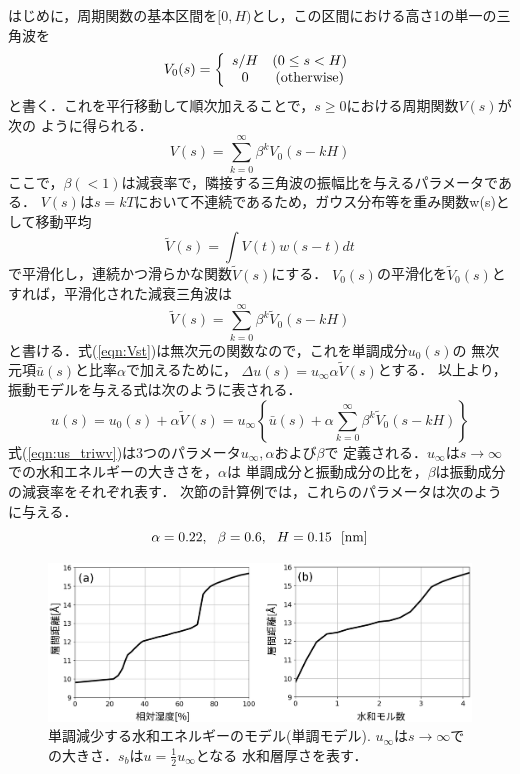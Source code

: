 はじめに，周期関数の基本区間を$[0,H)$とし，この区間における高さ1の単一の三角波を
\begin{equation}
	V_0(s)=\left\{
		\begin{array}{cc}
			s/H & (0\leq s < H) \\
			0 & ({\rm otherwise})
		\end{array}
	\right.
	\label{eqn:V0}
\end{equation}
と書く．これを平行移動して順次加えることで，$s\geq 0$における周期関数$V(s)$が次の
ように得られる．
\begin{equation}
	V(s)=\sum_{k=0}^{\infty} \beta ^{k} V_0(s-kH)
	\label{eqn:Vs}
\end{equation}
ここで，$\beta(<1)$は減衰率で，隣接する三角波の振幅比を与えるパラメータである．
$V(s)$は$s=kT$において不連続であるため，ガウス分布等を重み関数w(s)として移動平均
\begin{equation}
	\tilde V(s)=\int V(t)w(s-t)dt
	\label{eqn:mv_ave}
\end{equation}
で平滑化し，連続かつ滑らかな関数$\tilde V(s)$にする．
$V_0(s)$の平滑化を$\tilde V_0(s)$とすれば，平滑化された減衰三角波は
\begin{equation}
	\tilde V(s)=\sum_{k=0}^{\infty} \beta ^{k} \tilde V_0(s-kH)
	\label{eqn:Vst}
\end{equation}
と書ける．式(\ref{eqn:Vst})は無次元の関数なので，これを単調成分$u_0(s)$の
無次元項$\bar{u}(s)$と比率$\alpha$で加えるために，
$\Delta u(s)=u_\infty\alpha \tilde V(s)$とする．
以上より，振動モデルを与える式は次のように表される．
\begin{equation}
	u(s)=u_0(s)+ \alpha \tilde V(s)= u_{\infty}\left\{ 
	\bar{u}(s)+ \alpha \sum_{k=0}^{\infty} \beta ^{k} \tilde V_0(s-kH)
	\right\}
	\label{eqn:us_triwv}
\end{equation}
式(\ref{eqn:us_triwv})は3つのパラメータ$u_{\infty},\alpha$および$\beta$で
定義される．$u_{\infty}$は$s\rightarrow \infty$での水和エネルギーの大きさを，$\alpha$は
単調成分と振動成分の比を，$\beta$は振動成分の減衰率をそれぞれ表す．
次節の計算例では，これらのパラメータは次のように与える．
\begin{equation}
	\alpha=0.22, \ \ \beta=0.6, \ \ H=0.15 \ \ [{\rm nm}]
	\label{eqn:}
\end{equation}
\begin{figure}[h]
	\begin{center}
	\includegraphics[width=1.0\linewidth]{Figs/fig1.eps} 
	\end{center}
	\caption{
		単調減少する水和エネルギーのモデル(単調モデル).
		$u_{\infty}$は$s\rightarrow \infty$での大きさ．$s_b$は$u=\frac{1}{2}u_{\infty}$となる
		水和層厚さを表す．
	} 
	\label{fig:fig1}
\end{figure}
